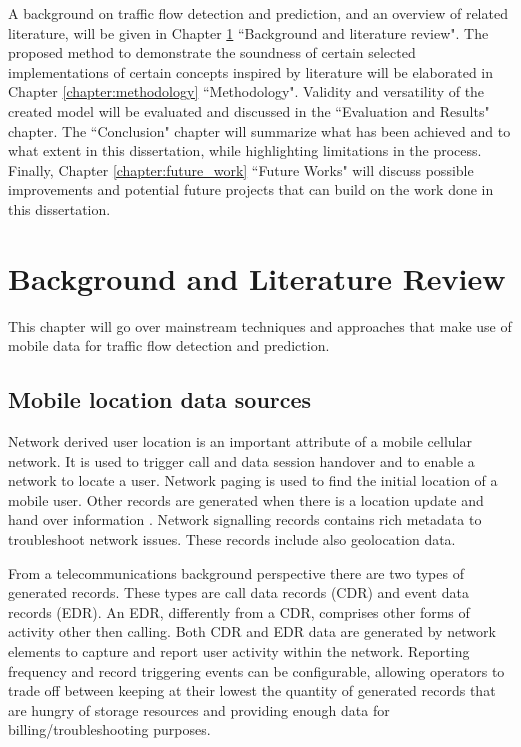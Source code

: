 \documentclass[12pt, a4paper]{report}
\theoremstyle{definition}
\theoremstyle{definition}%
\theoremstyle{definition}%
\theoremstyle{definition}%
\theoremstyle{definition}%
\theoremstyle{definition}%
\begin{document}
 A background on traffic flow detection and prediction, and an overview of related literature, will be given in Chapter \ref{chapter:background} ``Background and literature review". The proposed method to demonstrate the soundness of certain selected implementations of certain concepts inspired by literature will be elaborated in Chapter \ref{chapter:methodology} ``Methodology".  Validity and versatility of the created model will be evaluated and discussed in the ``Evaluation and Results" chapter.  The ``Conclusion" chapter will summarize what has been achieved and to what extent in this dissertation, while highlighting limitations in the process. Finally, Chapter  \ref{chapter:future_work} ``Future Works"  will discuss possible improvements and potential future projects that can build on the work done in this dissertation.



\chapter{Background and Literature Review} \label{chapter:background}

This chapter will go over mainstream techniques and approaches that make use of mobile data for traffic flow detection and prediction.

\section{Mobile location data sources} \label{background_mobile_location_data_sources} 

Network derived user location is an important attribute of a mobile cellular network. It is used to trigger call and data session handover and to enable a network to locate a user. Network paging is used to find the initial location of a mobile user. Other records are generated when there is a location update and hand over information \cite{Calabrese2011}. Network signalling records contains rich metadata to troubleshoot network issues. These records include also geolocation data. 

From a telecommunications background perspective there are two types of generated records.  These types are call data records (CDR) and event data records (EDR). An EDR, differently from a CDR, comprises other forms of activity other then calling. Both CDR and EDR data are generated by network elements to capture and report user activity within the network. Reporting frequency and record triggering events can be configurable, allowing operators to trade off between keeping at their lowest the quantity of generated records that are hungry of storage resources and providing enough data for billing/troubleshooting purposes.
\end{document}
